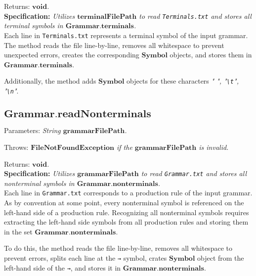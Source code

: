 Returns: \textit{\(\boldsymbol{void}\).}\\

\textbf{Specification:} \textit{Utilizes \(\boldsymbol{terminalFilePath}\) to read \texttt{Terminals.txt} and stores all terminal symbols in \(\boldsymbol{Grammar.terminals}\).}\\

Each line in \texttt{Terminals.txt} represents a terminal symbol of the input grammar. The method reads the file line-by-line, removes all whitespace to prevent unexpected errors, creates the corresponding \(\boldsymbol{Symbol}\) objects, and stores them in \(\boldsymbol{Grammar.terminals}\).

Additionally, the method adds \(\boldsymbol{Symbol}\) objects for these characters \textit{" ", "\texttt{\textbackslash t}", "\texttt{\textbackslash n}"}.

\vspace{30pt}

\subsection*{\(\boldsymbol{Grammar.readNonterminals}\)}

Parameters: \textit{String \(\boldsymbol{grammarFilePath}\).}

Throws: \textit{\(\boldsymbol{FileNotFoundException}\) if the \(\boldsymbol{grammarFilePath}\) is invalid.}

Returns: \textit{\(\boldsymbol{void}\).}\\

\textbf{Specification:} \textit{Utilizes \(\boldsymbol{grammarFilePath}\) to read \texttt{Grammar.txt} and stores all nonterminal symbols in \(\boldsymbol{Grammar.nonterminals}\).}\\

Each line in \texttt{Grammar.txt} corresponds to a production rule of the input grammar. As by convention at some point, every nonterminal symbol is referenced on the left-hand side of a production rule. Recognizing all nonterminal symbols requires extracting the left-hand side symbols from all production rules and storing them in the set \(\boldsymbol{Grammar.nonterminals}\).

To do this, the method reads the file line-by-line, removes all whitespace to prevent errors, splits each line at the \texttt{→} symbol, crates \(\boldsymbol{Symbol}\) object from the left-hand side of the \texttt{→}, and stores it in \(\boldsymbol{Grammar.nonterminals}\).

